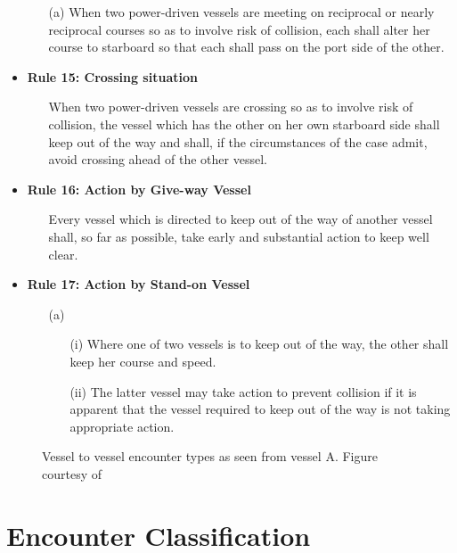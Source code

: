 \begin{itemize}
\begin{enumerate}
            \item[(a)] When two power-driven vessels are meeting on reciprocal or nearly reciprocal courses so as to involve risk of collision, each shall alter her course to starboard so that each shall pass on the port side of the other.
        \end{enumerate}
    \item \textbf{Rule 15: Crossing situation}
    \begin{enumerate}
        \item[] When two power-driven vessels are crossing so as to involve risk of collision, the vessel which has the other on her own starboard side shall keep out of the way and shall, if the circumstances of the case admit, avoid crossing ahead of the other vessel.
    
    \end{enumerate}
    \item \textbf{Rule 16: Action by Give-way Vessel}
    \begin{enumerate}
        \item [] Every vessel which is directed to keep out of the way of another vessel shall, so far as possible, take early and substantial action to keep well clear.
    \end{enumerate}
    \item \textbf{Rule 17: Action by Stand-on Vessel}
    \begin{enumerate}
        \item[(a)]
        \begin{enumerate}
            \item[(i)] Where one of two vessels is to keep out of the way, the other shall keep her course and speed.
            \item[(ii)] The latter vessel may take action to prevent collision if it is apparent that the vessel required to keep out of the way is not taking appropriate action.
        \end{enumerate}
    \end{enumerate}
\end{itemize}


\begin{figure}
    \centering
    
    \caption{Vessel to vessel encounter types as seen from vessel A. Figure courtesy of \cite{Thyri2022-VO}}
\end{figure}

\section{Encounter Classification}



